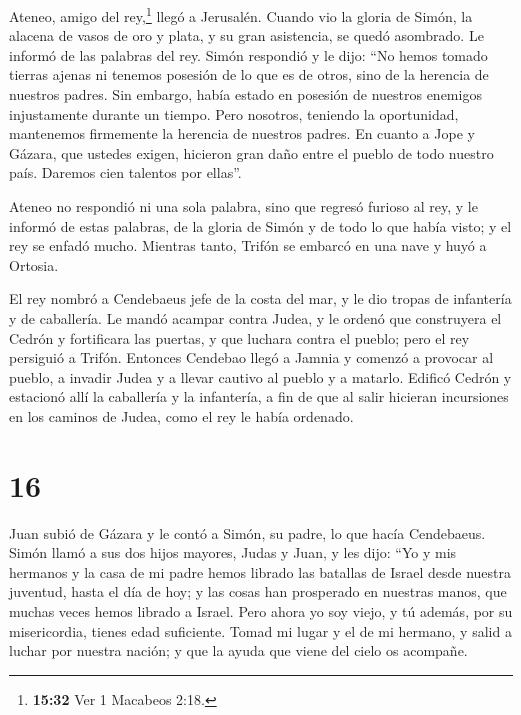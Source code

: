  Ateneo, amigo del rey,\footnote{\textbf{15:32} Ver 1
  Macabeos 2:18.} llegó a Jerusalén. Cuando vio la gloria de Simón, la
alacena de vasos de oro y plata, y su gran asistencia, se quedó
asombrado. Le informó de las palabras del rey.  Simón
respondió y le dijo: ``No hemos tomado tierras ajenas ni tenemos
posesión de lo que es de otros, sino de la herencia de nuestros padres.
Sin embargo, había estado en posesión de nuestros enemigos injustamente
durante un tiempo.  Pero nosotros, teniendo la
oportunidad, mantenemos firmemente la herencia de nuestros padres.
 En cuanto a Jope y Gázara, que ustedes exigen, hicieron
gran daño entre el pueblo de todo nuestro país. Daremos cien talentos
por ellas''.

Ateneo no respondió ni una sola palabra,  sino que
regresó furioso al rey, y le informó de estas palabras, de la gloria de
Simón y de todo lo que había visto; y el rey se enfadó mucho.
 Mientras tanto, Trifón se embarcó en una nave y huyó a
Ortosia.

 El rey nombró a Cendebaeus jefe de la costa del mar, y
le dio tropas de infantería y de caballería.  Le mandó
acampar contra Judea, y le ordenó que construyera el Cedrón y
fortificara las puertas, y que luchara contra el pueblo; pero el rey
persiguió a Trifón.  Entonces Cendebao llegó a Jamnia y
comenzó a provocar al pueblo, a invadir Judea y a llevar cautivo al
pueblo y a matarlo.  Edificó Cedrón y estacionó allí la
caballería y la infantería, a fin de que al salir hicieran incursiones
en los caminos de Judea, como el rey le había ordenado.

\hypertarget{section-15}{%
\section{16}\label{section-15}}

 Juan subió de Gázara y le contó a Simón, su padre, lo que
hacía Cendebaeus.  Simón llamó a sus dos hijos mayores,
Judas y Juan, y les dijo: ``Yo y mis hermanos y la casa de mi padre
hemos librado las batallas de Israel desde nuestra juventud, hasta el
día de hoy; y las cosas han prosperado en nuestras manos, que muchas
veces hemos librado a Israel.  Pero ahora yo soy viejo, y
tú además, por su misericordia, tienes edad suficiente. Tomad mi lugar y
el de mi hermano, y salid a luchar por nuestra nación; y que la ayuda
que viene del cielo os acompañe.

